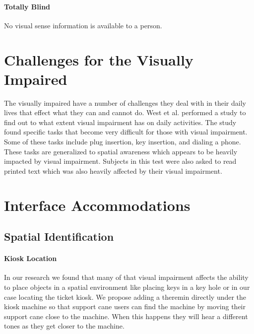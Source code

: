 \documentclass{article}
\begin{document}
        \paragraph{Totally Blind}
            No visual sense information is available to a person.\cite{VISAUL_IMPAIRMENT_DEF}

    \section{Challenges for the Visually Impaired}
        The visually impaired have a number of challenges they deal with in their 
        daily lives that effect what they can and cannot do. West et al. performed a study
        to find out to what extent visual impairment has on daily activities. The study found
        specific tasks that become very difficult for those with visual impairment. Some of these
        tasks include plug insertion, key insertion, and dialing a phone\cite{doi:10.1001/archopht.120.6.774}. 
        These tasks are generalized to spatial awareness which appears to be heavily impacted by visual impairment.
        Subjects in this test were also asked to read printed text which was also heavily affected by their
        visual impairment.


    \section{Interface Accommodations}
        \subsection{Spatial Identification}
            \paragraph{Kiosk Location} In our research we found that many of that visual impairment affects the 
            ability to place objects in a spatial environment like placing keys in a key hole or in our case
            locating the ticket kiosk. We propose adding a theremin directly under the kiosk machine so that
            support cane users can find the machine by moving their support cane close to the machine. When this
            happens they will hear a different tones as they get closer to the machine.
            
\end{document}
